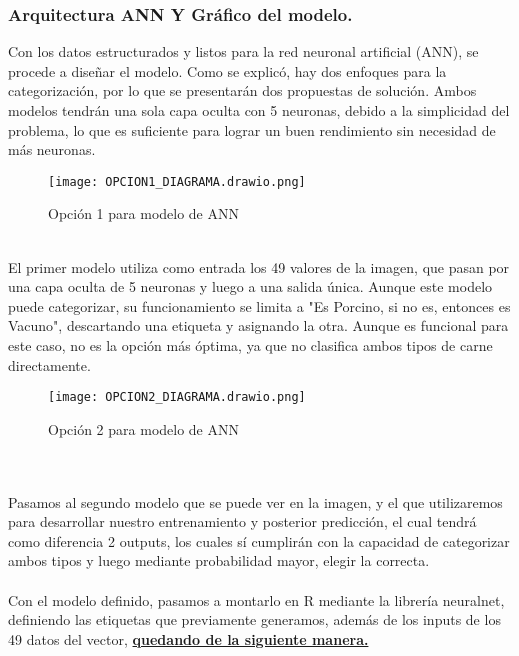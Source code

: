\documentclass[12pt]{article}
\begin{document}
\subsubsection{Arquitectura ANN Y Gráfico del modelo.}
Con los datos estructurados y listos para la red neuronal artificial (ANN), se procede a diseñar el modelo. Como se explicó, hay dos enfoques para la categorización, por lo que se presentarán dos propuestas de solución. Ambos modelos tendrán una sola capa oculta con 5 neuronas, debido a la simplicidad del problema, lo que es suficiente para lograr un buen rendimiento sin necesidad de más neuronas.\\
\begin{figure}[h]
    \centering
    \texttt{[image: OPCION1\_DIAGRAMA.drawio.png]} 
    \caption{ Opción 1 para modelo de ANN}
    \label{fig:Vacuno_Porcino}
\end{figure}
\\
El primer modelo utiliza como entrada los 49 valores de la imagen, que pasan por una capa oculta de 5 neuronas y luego a una salida única. Aunque este modelo puede categorizar, su funcionamiento se limita a "Es Porcino, si no es, entonces es Vacuno", descartando una etiqueta y asignando la otra. Aunque es funcional para este caso, no es la opción más óptima, ya que no clasifica ambos tipos de carne directamente.
\begin{figure}[h]
    \centering
    \texttt{[image: OPCION2\_DIAGRAMA.drawio.png]} 
    \caption{ Opción 2 para modelo de ANN}
    \label{fig:Vacuno_Porcino}
\end{figure}
\\
\\
Pasamos al segundo modelo que se puede ver en la imagen, y el que utilizaremos para desarrollar nuestro entrenamiento y posterior predicción, el cual tendrá como diferencia 2 outputs, los cuales sí cumplirán con la capacidad de categorizar ambos tipos y luego mediante probabilidad mayor, elegir la correcta. \\
\\
Con el modelo definido, pasamos a montarlo en R mediante la librería neuralnet, definiendo las etiquetas que previamente generamos, además de los inputs de los 49 datos del vector, \hyperref[lst:modelo_red_neuronal]{\textbf{quedando de la siguiente manera.}}
\end{document}
